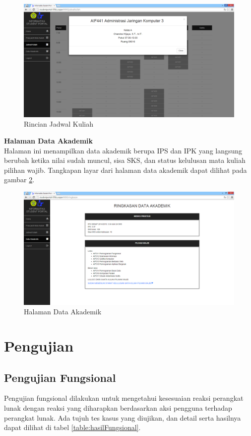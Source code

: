 					\begin{figure}[H]
						\centering
						\includegraphics[scale=0.5]{Gambar/hasil_jadwal_popup}
						\caption{Rincian Jadwal Kuliah} 
						\label{fig:5_hasil_jadwal_rinci}
					\end{figure}
					
				\textbf{Halaman Data Akademik}\\
				Halaman ini menampilkan data akademik berupa IPS dan IPK yang langsung berubah ketika nilai sudah muncul, sisa SKS, dan status kelulusan mata kuliah pilihan wajib. Tangkapan layar dari halaman data akademik dapat dilihat pada gambar \ref{fig:5_hasil_ringkasan}.
				\begin{figure}[H]
						\centering
						\includegraphics[scale=0.5]{Gambar/hasil_ringkasan}
						\caption{Halaman Data Akademik} 
						\label{fig:5_hasil_ringkasan}
					\end{figure}
				
\section{Pengujian}
			\subsection{Pengujian Fungsional} 
			Pengujian fungsional dilakukan untuk mengetahui kesesuaian reaksi perangkat lunak dengan reaksi yang diharapkan berdasarkan aksi pengguna terhadap perangkat lunak. Ada tujuh tes kasus yang diujikan, dan detail serta hasilnya dapat dilihat di tabel \ref{table:hasilFungsional}.
			
